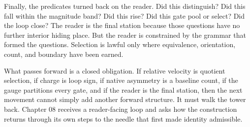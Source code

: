 Finally, the predicates turned back on the reader. Did this distinguish? Did
this fall within the magnitude band? Did this rise? Did this gate pool or
select? Did the loop close? The reader is the final station because those
questions have no further interior hiding place. But the reader is
constrained by the grammar that formed the questions. Selection is lawful
only where equivalence, orientation, count, and boundary have been earned.

What passes forward is a closed obligation. If relative velocity is quotient
selection, if charge is loop sign, if native asymmetry is a baseline count,
if the gauge partitions every gate, and if the reader is the final station,
then the next movement cannot simply add another forward structure. It must
walk the tower back. Chapter 08 receives a reader-facing loop and asks how
the construction returns through its own steps to the needle that first made
identity admissible.
